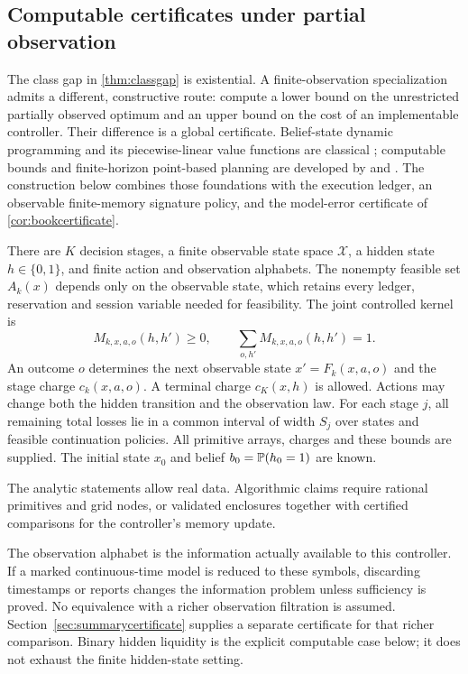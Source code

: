 \subsection{Computable certificates under partial observation}
\label{sec:computablepartial}

The class gap in \cref{thm:classgap} is existential. A finite-observation
specialization admits a different, constructive route: compute a lower bound
on the unrestricted partially observed optimum and an upper bound on the
cost of an implementable controller. Their difference is a global certificate.
Belief-state dynamic programming and its piecewise-linear value functions are
classical \citep{smallwood1973}; computable bounds and finite-horizon
point-based planning are developed by \citet{lovejoy1991} and
\citet{walravenspaan2019}. The construction below combines those foundations
with the execution ledger, an observable finite-memory signature policy, and
the model-error certificate of \cref{cor:bookcertificate}.

\begin{assumption}
\label{ass:finiteobservation}
There are $K$ decision stages, a finite observable state space $\mathcal X$,
a hidden state $h\in\{0,1\}$, and finite action and observation alphabets.
The nonempty feasible set $A_k(x)$ depends only on the observable state,
which retains every ledger, reservation and session variable needed for
feasibility. The joint controlled kernel is
\[
 M_{k,x,a,o}(h,h')\ge0,\qquad
 \sum_{o,h'}M_{k,x,a,o}(h,h')=1.
\]
An outcome $o$ determines the next observable state $x'=F_k(x,a,o)$ and
the stage charge $c_k(x,a,o)$. A terminal charge $c_K(x,h)$ is allowed.
Actions may change both the hidden transition and the observation law.
For each stage $j$, all remaining total losses lie in a common interval of
width $S_j$ over states and feasible continuation policies. All primitive
arrays, charges and these bounds are supplied. The initial state $x_0$ and
belief $b_0=\mathbb P(h_0=1)$ are known.
\end{assumption}

The analytic statements allow real data. Algorithmic claims require rational
primitives and grid nodes, or validated enclosures together with certified
comparisons for the controller's memory update.

The observation alphabet is the information actually available to this
controller. If a marked continuous-time model is reduced to these symbols,
discarding timestamps or reports changes the information problem unless
sufficiency is proved. No equivalence with a richer observation filtration
is assumed. Section~\ref{sec:summarycertificate} supplies a separate
certificate for that richer comparison. Binary hidden liquidity is the explicit computable case below;
it does not exhaust the finite hidden-state setting.

